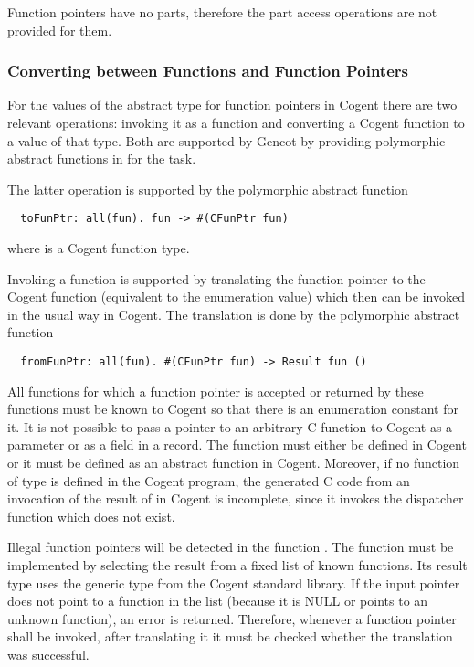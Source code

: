 Function pointers have no parts, therefore the part access operations are not provided for them.

\subsubsection{Converting between Functions and Function Pointers}

For the values of the abstract type for function pointers in Cogent there are two relevant operations: invoking
it as a function and converting a Cogent function to a value of that type. Both are supported by Gencot
by providing polymorphic abstract functions in  for the task.

The latter operation is supported by the polymorphic abstract function
\begin{verbatim}
  toFunPtr: all(fun). fun -> #(CFunPtr fun)
\end{verbatim}
where  is a Cogent function type.

Invoking a function is supported by translating the function pointer to the Cogent function (equivalent to the enumeration value) which
then can be invoked in the usual way in Cogent. The translation is done by the polymorphic abstract function
\begin{verbatim}
  fromFunPtr: all(fun). #(CFunPtr fun) -> Result fun ()
\end{verbatim}

All functions for which a function pointer is accepted or returned by these functions must be known to
Cogent so that there is an enumeration constant for it. It is not possible to pass a pointer to an arbitrary 
C function to Cogent as a parameter or as a field in a record. The function must either be defined in Cogent 
or it must be defined as an abstract function in Cogent. Moreover, if no function of type  is 
defined in the Cogent program, the generated C code from an invocation of the result of  
in Cogent is incomplete, since it invokes the dispatcher function which does not exist.

Illegal function pointers will be detected in the function . The function must be implemented 
by selecting the result from a fixed list of known functions. Its result type uses the generic type 
from the Cogent standard library. If the input pointer does not point to a 
function in the list (because it is NULL or points to an unknown function), an error is returned. Therefore,
whenever a function pointer shall be invoked, after translating it it must be checked whether the translation
was successful.

